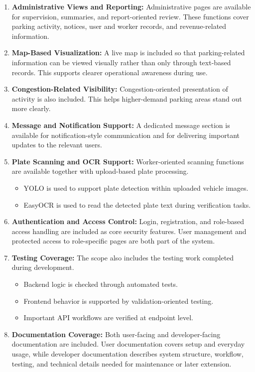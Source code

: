 \documentclass[12pt,a4paper,oneside]{report}
\begin{document}
\begin{enumerate}[leftmargin=2em,label=\arabic*.]
    \item \textbf{Administrative Views and Reporting:} Administrative pages are available for supervision, summaries, and report-oriented review. These functions cover parking activity, notices, user and worker records, and revenue-related information.

    \item \textbf{Map-Based Visualization:} A live map is included so that parking-related information can be viewed visually rather than only through text-based records. This supports clearer operational awareness during use.

    \item \textbf{Congestion-Related Visibility:} Congestion-oriented presentation of activity is also included. This helps higher-demand parking areas stand out more clearly.

    \item \textbf{Message and Notification Support:} A dedicated message section is available for notification-style communication and for delivering important updates to the relevant users.

    \item \textbf{Plate Scanning and OCR Support:} Worker-oriented scanning functions are available together with upload-based plate processing.
    \begin{itemize}[leftmargin=2.2em]
        \item YOLO is used to support plate detection within uploaded vehicle images.
        \item EasyOCR is used to read the detected plate text during verification tasks.
    \end{itemize}

    \item \textbf{Authentication and Access Control:} Login, registration, and role-based access handling are included as core security features. User management and protected access to role-specific pages are both part of the system.

    \item \textbf{Testing Coverage:} The scope also includes the testing work completed during development.
    \begin{itemize}[leftmargin=2.2em]
        \item Backend logic is checked through automated tests.
        \item Frontend behavior is supported by validation-oriented testing.
        \item Important API workflows are verified at endpoint level.
    \end{itemize}

    \item \textbf{Documentation Coverage:} Both user-facing and developer-facing documentation are included. User documentation covers setup and everyday usage, while developer documentation describes system structure, workflow, testing, and technical details needed for maintenance or later extension.
\end{enumerate}
\end{document}
